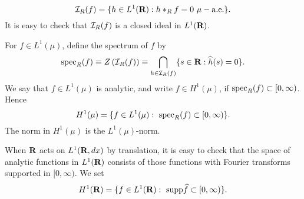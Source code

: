 \begin{equation}
\cI_R(f)=\{h\in L^1(\R): h*_Rf=0\ \mu -{\rm a.e.}\}.
\label{ideal}
\end{equation}
It is easy to check that ${\cal I}_R(f)$ is a closed ideal in 
$L^1(\R)$.
\begin{defspec}
For $f\in L^1(\mu)$, define the spectrum of $f$ by
\begin{equation}
\spec_R(f)\equiv Z\left(\cI_R (f)\right)\equiv
\bigcap_{h\in \cI_R(f) }
\{s\in\R: \widehat{h}(s)=0\}.
\label{spectrum}
\end{equation}
We say that $f\in L^1(\mu)$ is analytic,
and write $f\in H^1(\mu)$,
 if ${\rm spec}_R(f)\subset [0,\infty)$.  Hence
$$H^1(\mu)=\{f\in L^1(\mu):\ \spec_R(f)\subset [0,\infty)\}.$$
The norm in $H^1(\mu)$ is the $L^1(\mu)$-norm.
\label{defspec}
\end{defspec}
When $\R$ acts on $L^1(\R,d x)$ by translation, 
it is easy to check that the space of
analytic functions in $L^1(\R)$ consists of those functions
with Fourier transforms supported in $[0,\infty)$.
We set
$$H^1(\R)=
\{f\in L^1(\R):\ \supp \widehat{f}\subset [0,\infty)\}.$$

